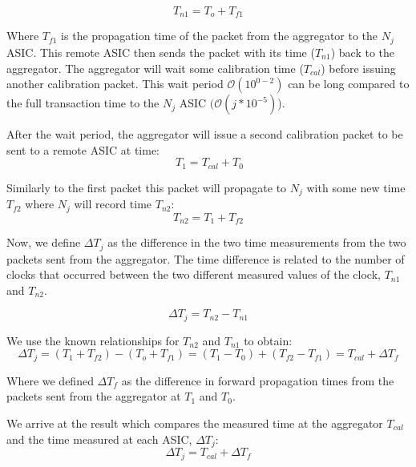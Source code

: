 \begin{equation}
  T_{n1} = T_{o} + T_{f1}
\end{equation}


Where $T_{f1}$ is the propagation time of the packet from the aggregator to the $N_{j}$ ASIC.
This remote ASIC then sends the packet with its time ($T_{n1}$) back to the aggregator.
The aggregator will wait some calibration time ($T_{cal}$) before issuing another calibration packet.
This wait period $\mathcal{O(10^{0-2})}$ can be long compared to the full transaction time to the $N_{j}$ ASIC $(\mathcal{O}(j*10^{-5})$).

After the wait period, the aggregator will issue a second calibration packet to be sent to a remote ASIC at time:
\begin{equation}~\label{eq:calibration_wait_time}
  T_{1} = T_{cal} + T_{0}
\end{equation}

Similarly to the first packet this packet will propagate to $N_{j}$ with some new time $T_{f2}$ where $N_{j}$ will record time $T_{n2}$:
\begin{equation}
  T_{n2} = T_{1} + T_{f2}
\end{equation}

Now, we define $\Delta T_{j}$ as the difference in the two time measurements from the two packets sent from the aggregator.
The time difference is related to the number of clocks that occurred between the two different measured values of the clock, $T_{n1}$ and $T_{n2}$.

\begin{equation}
  \Delta T_{j} = T_{n2} - T_{n1}
\end{equation}

We use the known relationships for $T_{n2}$ and $T_{n1}$ to obtain:
\begin{equation}
  \Delta T_{j} = (T_{1} + T_{f2}) - (T_{o} + T_{f1}) = (T_{1} - T_{0}) + (T_{f2} - T_{f1}) = T_{cal} + \Delta T_{f}
\end{equation}

Where we defined $\Delta T_{f}$ as the difference in forward propagation times from the packets sent from the aggregator at $T_{1}$ and $T_{0}$.

We arrive at the result which compares the measured time at the aggregator $T_{cal}$ and the time measured at each ASIC, $\Delta T_{j}$:
\begin{equation}
  \Delta T_{j} = T_{cal} + \Delta T_{f}
\end{equation}

